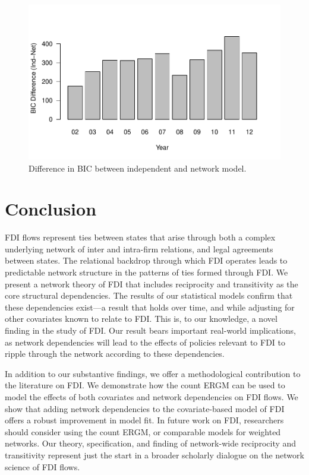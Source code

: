 \documentclass{article}
\begin{document}
\begin{figure}[htp]
\centering
\includegraphics[scale=.75]{draft_figures/BICdiff.pdf} \vspace{-.5cm}
\caption{\label{fig:bic} Difference in BIC between independent and network model.}
\end{figure}


\section{Conclusion}

FDI flows represent ties between states that arise through both a complex underlying network of inter and intra-firm relations, and legal agreements between states. The relational backdrop through which FDI operates leads to predictable network structure in the patterns of ties formed through FDI. We present a network theory of FDI that includes reciprocity and transitivity as the core structural dependencies. The results of our statistical models confirm that these dependencies exist---a result that holds over time, and while adjusting for other covariates known to relate to FDI. This is, to our knowledge, a novel finding in the study of FDI. Our result bears important real-world implications, as network dependencies will lead to the effects of policies relevant to FDI to ripple through the network according to these dependencies.

In addition to our substantive findings, we offer a methodological contribution to the literature on FDI. We demonstrate how the count ERGM can be used to model the effects of both covariates and network dependencies on FDI flows. We show that adding network dependencies to the covariate-based model of FDI offers a robust improvement in model fit. In future work on FDI, researchers should consider using the count ERGM, or comparable models for weighted networks. Our theory, specification, and finding of network-wide reciprocity and transitivity represent just the start in a broader scholarly dialogue on the network science of FDI flows.




\end{document}
